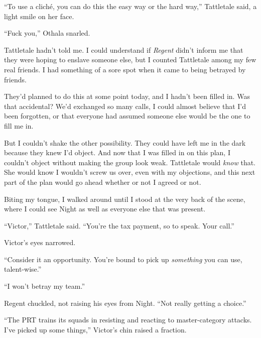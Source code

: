 





``To use a clich\'{e}, you can do this the easy way or the hard way,'' Tattletale said, a light smile on her face.



``Fuck you,'' Othala snarled.



Tattletale hadn't told me.  I could understand if \emph{Regent} didn't inform me that they were hoping to enslave someone else, but I counted Tattletale among my few real friends.  I had something of a sore spot when it came to being betrayed by friends.



They'd planned to do this at some point today, and I hadn't been filled in.  Was that accidental?  We'd exchanged so many calls, I could almost believe that I'd been forgotten, or that everyone had assumed someone else would be the one to fill me in.



But I couldn't shake the other possibility.  They could have left me in the dark because they knew I'd object.  And now that I was filled in on this plan, I couldn't object without making the group look weak.  Tattletale would\emph{ know }that.  She would know I wouldn't screw us over, even with my objections, and this next part of the plan would go ahead whether or not I agreed or not.



Biting my tongue, I walked around until I stood at the very back of the scene, where I could see Night as well as everyone else that was present.



``Victor,'' Tattletale said.  ``You're the tax payment, so to speak.  Your call.''



Victor's eyes narrowed.



``Consider it an opportunity.  You're bound to pick up \emph{something} you can use, talent-wise.''



``I won't betray my team.''



Regent chuckled, not raising his eyes from Night.  ``Not really getting a choice.''



``The PRT trains its squads in resisting and reacting to master-category attacks.  I've picked up some things,'' Victor's chin raised a fraction.



